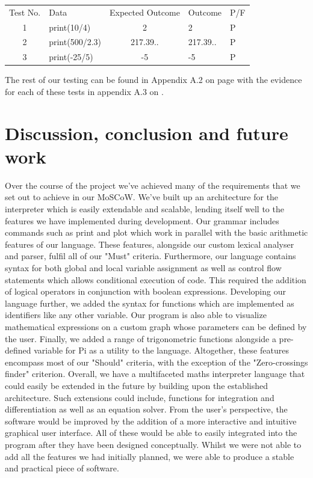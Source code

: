 \documentclass[a4paper, oneside, 11pt]{report}
\begin{document}
\begin{table}
\begin{tabular}{clcll}
\multicolumn{1}{l}{Test No.} & Data            & \multicolumn{1}{l}{Expected Outcome}  & Outcome & P/F \\
1                            & print(10/4)      & 2                                    &  2       & P    \\
2                            & print(500/2.3)   & 217.39..                                   &  217.39..       &    P \\
3                            & print(-25/5)    & -5                                   &     -5    &   P  \\ \hline
\end{tabular}
\end{table}

The rest of our testing can be found in Appendix A.2 on page \pageref{results} with the evidence for each of these tests in appendix A.3 on \pageref{evidence}.

\chapter{Discussion, conclusion and future work}

Over the course of the project we've achieved many of the requirements that we set out to achieve in our MoSCoW.
We've built up an architecture for the interpreter which is easily extendable and scalable, lending itself well to the features we have implemented during development.
Our grammar includes commands such as print and plot which work in parallel with the basic arithmetic features of our language. 
These features, alongside our custom lexical analyser and parser, fulfil all of our "Must" criteria. 
Furthermore, our language contains syntax for both global and local variable assignment as well as control flow statements which allows conditional execution of code.
This required the addition of logical operators in conjunction with boolean expressions. 
Developing our language further, we added  the syntax for functions which are implemented as identifiers like any other variable.
Our program is also able to visualize mathematical expressions on a custom graph whose parameters can be defined by the user.
Finally, we added a range of trigonometric functions alongside a pre-defined variable for Pi as a utility to the language.
Altogether, these features encompass most of our "Should" criteria, with the exception of the "Zero-crossings finder" criterion.
Overall, we have a multifaceted maths interpreter language that could easily be extended in the future by building upon the established architecture.
Such extensions could include, functions for integration and differentiation as well as an equation solver. From the user's perspective, the software would be improved by the addition of 
a more interactive and intuitive graphical user interface. All of these would be able to easily integrated into the program after they have been designed conceptually.
Whilst we were not able to add all the features we had initially planned, we were able to produce a stable and practical piece of software.
\end{document}
